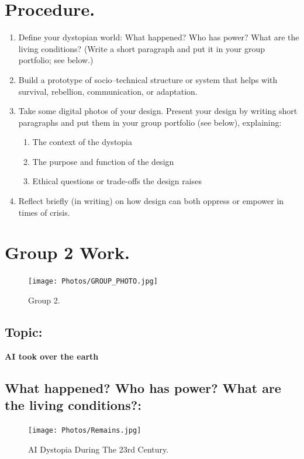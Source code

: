 \documentclass[11pt]{book}
\begin{document}
		\section{Procedure.}
				\begin{enumerate}
					\item Define your dystopian world: What happened? Who has power? What are the living conditions? (Write a short paragraph and put it in your group portfolio; see below.)
					\item Build a prototype of socio–technical structure or system that helps with survival, rebellion, communication, or adaptation.
					\item Take some digital photos of your design. Present your design by writing short paragraphs and put them in your group portfolio (see below), explaining:
						\begin{enumerate}
							\item The context of the dystopia
							\item The purpose and function of the design
							\item Ethical questions or trade-offs the design raises
						\end{enumerate}
					\item Reflect briefly (in writing) on how design can both oppress or empower in times of crisis.
				\end{enumerate}

\pagebreak
		\section{Group 2 Work.}
						\begin{figure}[H]
							\begin{center}
  							\texttt{[image: Photos/GROUP\_PHOTO.jpg]}
  							\end{center}
 							\caption{Group 2.}
						\end{figure}
		
			\subsection{Topic:}
				\begin{center}
					\textbf{AI took over the earth}
				\end{center}

			\subsection{What happened? Who has power? What are the living
conditions?:}
				\begin{figure}[H]
							\begin{center}
  							\texttt{[image: Photos/Remains.jpg]}
  							\end{center}
 							\caption{AI Dystopia During The 23rd Century.}
				\end{figure}
						
\end{document}

